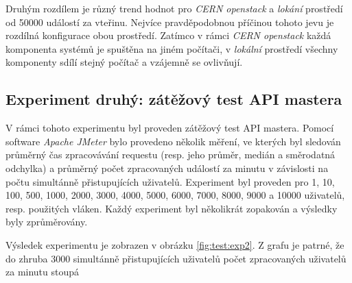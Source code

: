 Druhým rozdílem je různý trend hodnot pro \textit{CERN openstack} a \textit{lokání} prostředí od 50000 událostí za vteřinu. Nejvíce pravděpodobnou příčinou tohoto jevu je rozdílná konfigurace obou prostředí. Zatímco v rámci \textit{CERN openstack} každá komponenta systémů je spuštěna na jiném počítači, v \textit{lokální} prostředí všechny komponenty sdílí stejný počítač a vzájemně se ovlivňují.

\subsection{Experiment druhý: zátěžový test API mastera}
V rámci tohoto experimentu byl proveden zátěžový test API mastera. Pomocí software \textit{Apache JMeter} bylo provedeno několik měření, ve kterých byl sledován průměrný čas zpracovávání requestu (resp. jeho průměr, medián a směrodatná odchylka) a průměrný počet zpracovaných událostí za minutu v závislosti na počtu simultánně přistupujících uživatelů. Experiment byl proveden pro 1, 10, 100, 500, 1000, 2000, 3000, 4000, 5000, 6000, 7000, 8000, 9000 a 10000 uživatelů, resp. použitých vláken. Každý experiment byl několikrát zopakován a výsledky byly zprůměrovány. 

Výsledek experimentu je zobrazen v obrázku \ref{fig:test:exp2}. Z grafu je patrné, že do zhruba 3000 simultánně přistupujících uživatelů počet zpracovaných uživatelů za minutu stoupá


